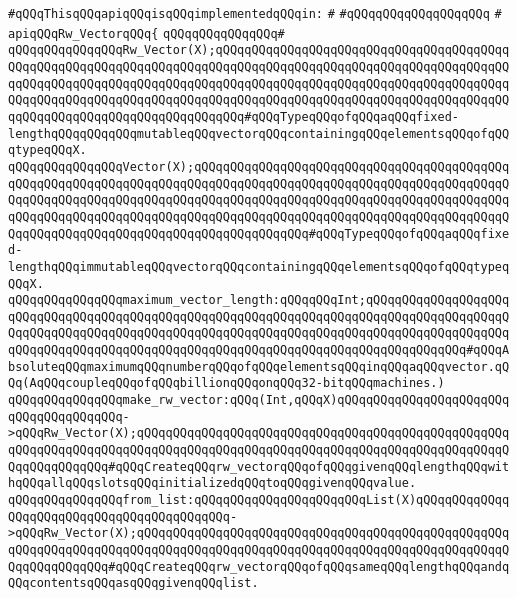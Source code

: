 \newline
\newline
\verb|#qQQqThisqQQqapiqQQqisqQQqimplementedqQQqin:|\newline
\verb|#|\newline
\verb|#qQQqqQQqqQQqqQQqqQQq|\newline
\verb|#|\newline
\verb|apiqQQqRw_VectorqQQq{|\newline
\verb|qQQqqQQqqQQqqQQq#|\newline
\verb|qQQqqQQqqQQqqQQqRw_Vector(X);qQQqqQQqqQQqqQQqqQQqqQQqqQQqqQQqqQQqqQQqqQQqqQQqqQQqqQQqqQQqqQQqqQQqqQQqqQQqqQQqqQQqqQQqqQQqqQQqqQQqqQQqqQQqqQQqqQQqqQQqqQQqqQQqqQQqqQQqqQQqqQQqqQQqqQQqqQQqqQQqqQQqqQQqqQQqqQQqqQQqqQQqqQQqqQQqqQQqqQQqqQQqqQQqqQQqqQQqqQQqqQQqqQQqqQQqqQQqqQQqqQQqqQQqqQQqqQQqqQQqqQQqqQQqqQQqqQQqqQQqqQQq#qQQqTypeqQQqofqQQqaqQQqfixed-lengthqQQqqQQqqQQqmutableqQQqvectorqQQqcontainingqQQqelementsqQQqofqQQqtypeqQQqX.|\newline
\verb|qQQqqQQqqQQqqQQqVector(X);qQQqqQQqqQQqqQQqqQQqqQQqqQQqqQQqqQQqqQQqqQQqqQQqqQQqqQQqqQQqqQQqqQQqqQQqqQQqqQQqqQQqqQQqqQQqqQQqqQQqqQQqqQQqqQQqqQQqqQQqqQQqqQQqqQQqqQQqqQQqqQQqqQQqqQQqqQQqqQQqqQQqqQQqqQQqqQQqqQQqqQQqqQQqqQQqqQQqqQQqqQQqqQQqqQQqqQQqqQQqqQQqqQQqqQQqqQQqqQQqqQQqqQQqqQQqqQQqqQQqqQQqqQQqqQQqqQQqqQQqqQQqqQQqqQQqqQQq#qQQqTypeqQQqofqQQqaqQQqfixed-lengthqQQqimmutableqQQqvectorqQQqcontainingqQQqelementsqQQqofqQQqtypeqQQqX.|\newline
\newline
\verb|qQQqqQQqqQQqqQQqmaximum_vector_length:qQQqqQQqInt;qQQqqQQqqQQqqQQqqQQqqQQqqQQqqQQqqQQqqQQqqQQqqQQqqQQqqQQqqQQqqQQqqQQqqQQqqQQqqQQqqQQqqQQqqQQqqQQqqQQqqQQqqQQqqQQqqQQqqQQqqQQqqQQqqQQqqQQqqQQqqQQqqQQqqQQqqQQqqQQqqQQqqQQqqQQqqQQqqQQqqQQqqQQqqQQqqQQqqQQqqQQqqQQqqQQqqQQqqQQqqQQq#qQQqAbsoluteqQQqmaximumqQQqnumberqQQqofqQQqelementsqQQqinqQQqaqQQqvector.qQQq(AqQQqcoupleqQQqofqQQqbillionqQQqonqQQq32-bitqQQqmachines.)|\newline
\newline
\verb|qQQqqQQqqQQqqQQqmake_rw_vector:qQQq(Int,qQQqX)qQQqqQQqqQQqqQQqqQQqqQQqqQQqqQQqqQQqqQQq->qQQqRw_Vector(X);qQQqqQQqqQQqqQQqqQQqqQQqqQQqqQQqqQQqqQQqqQQqqQQqqQQqqQQqqQQqqQQqqQQqqQQqqQQqqQQqqQQqqQQqqQQqqQQqqQQqqQQqqQQqqQQqqQQqqQQqqQQqqQQqqQQqqQQq#qQQqCreateqQQqrw_vectorqQQqofqQQqgivenqQQqlengthqQQqwithqQQqallqQQqslotsqQQqinitializedqQQqtoqQQqgivenqQQqvalue.|\newline
\verb|qQQqqQQqqQQqqQQqfrom_list:qQQqqQQqqQQqqQQqqQQqqQQqList(X)qQQqqQQqqQQqqQQqqQQqqQQqqQQqqQQqqQQqqQQqqQQq->qQQqRw_Vector(X);qQQqqQQqqQQqqQQqqQQqqQQqqQQqqQQqqQQqqQQqqQQqqQQqqQQqqQQqqQQqqQQqqQQqqQQqqQQqqQQqqQQqqQQqqQQqqQQqqQQqqQQqqQQqqQQqqQQqqQQqqQQqqQQqqQQqqQQq#qQQqCreateqQQqrw_vectorqQQqofqQQqsameqQQqlengthqQQqandqQQqcontentsqQQqasqQQqgivenqQQqlist.|\newline
